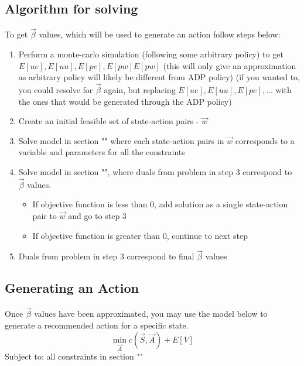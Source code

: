 \documentclass{article}
\begin{document}
\subsection{Algorithm for solving}
To get $\vec{\beta}$ values, which will be used to generate an action follow steps below:
\begin{enumerate}
	\item Perform a monte-carlo simulation (following some arbitrary policy) to get $E[ue], E[uu], E[pe], E[pw] E[pw]$ (this will only give an approximation as arbitrary policy will likely be different from ADP policy) (if you wanted to, you could resolve for $\vec{\beta}$ again, but replacing $E[ue], E[uu], E[pe], ...$ with the ones that would be generated through the ADP policy) 
	\item Create an initial feasible set of state-action pairs - $\vec{w}$
	\item Solve model in section "" where each state-action pairs in $\vec{w}$ corresponds to a variable and parameters for all the constraints
	\item Solve model in section "", where duals from problem in step 3  correspond to $\vec{\beta}$ values. 
		\begin{itemize}
			\item If objective function is less than 0, add solution as a single state-action pair to $\vec{w}$ and go to step 3
			\item If objective function is greater than 0, continue to next step
		\end{itemize}
	\item Duals from problem in step 3 correspond to final $\vec{\beta}$ values
\end{enumerate}
	
\subsection{Generating an Action}
Once $\vec{\beta}$ values have been approximated, you may use the model below to generate a recommended action for a specific state.
\begin{equation}
	\min_{\vec{A}} c(\vec{S}, \vec{A}) + E[V]
\end{equation}
Subject to:
all constraints in section ""
\end{document}
